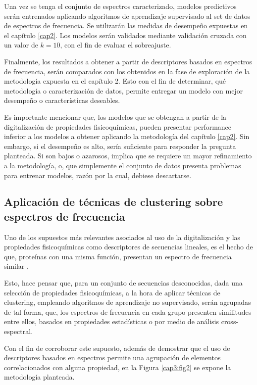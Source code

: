 Una vez se tenga el conjunto de espectros caracterizado, modelos predictivos serán entrenados aplicando algoritmos de aprendizaje supervisado al set de datos de espectros de frecuencia. Se utilizarán las medidas de desempeño expuestas en el capítulo \ref{cap2}. Los modelos serán validados mediante validación cruzada con un valor de $k=10$, con el fin de evaluar el sobreajuste. 

Finalmente, los resultados a obtener a partir de descriptores basados en espectros de frecuencia, serán comparados con los obtenidos en la fase de exploración de la metodología expuesta en el capítulo 2. Esto con el fin de determinar, qué metodología o caracterización de datos, permite entregar un modelo con mejor desempeño o características deseables. 

Es importante mencionar que, los modelos que se obtengan a partir de la digitalización de propiedades fisicoquímicas, pueden presentar  performance inferior a los modelos a obtener aplicando la metodología del capítulo \ref{cap2}. Sin embargo, si el desempeño es alto, sería suficiente para responder la pregunta planteada. Si son bajos o azarosos, implica que se requiere un mayor refinamiento a la metodología, o, que simplemente el conjunto de datos presenta problemas para entrenar modelos, razón por la cual, debiese descartarse. 

\subsection{Aplicación de técnicas de clustering sobre espectros de frecuencia}

Uno de los supuestos más relevantes asociados al uso de la digitalización y las propiedades fisicoquímicas como descriptores de secuencias lineales, es el hecho de que, proteínas con una misma función, presentan un espectro de frecuencia similar \cite{veljkovic1985possible}. 

Esto, hace pensar que, para un conjunto de secuencias desconocidas, dada una selección de propiedades fisicoquímicas, a la hora de aplicar técnicas de clustering, empleando algoritmos de aprendizaje no supervisado, serán agrupadas de tal forma, que, los espectros de frecuencia en cada grupo presenten similitudes entre ellos, basados en propiedades estadísticas o por medio de análisis cross-espectral.
 
Con el fin de corroborar este supuesto, además de demostrar que el uso de descriptores basados en espectros permite una agrupación de elementos correlacionados con alguna propiedad, en la Figura \ref{cap3:fig2} se expone la metodología planteada.


